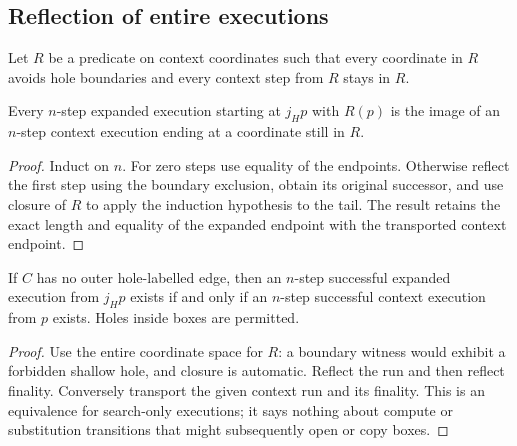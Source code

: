 \subsection{Reflection of entire executions}
Let $R$ be a predicate on context coordinates such that every coordinate in $R$
avoids hole boundaries and every context step from $R$ stays in $R$.
\begin{theorem}
Every $n$-step expanded execution starting at $j_Hp$ with $R(p)$ is the image
of an $n$-step context execution ending at a coordinate still in $R$.
\end{theorem}
\begin{proof}
Induct on $n$. For zero steps use equality of the endpoints. Otherwise reflect
the first step using the boundary exclusion, obtain its original successor,
and use closure of $R$ to apply the induction hypothesis to the tail. The
result retains the exact length and equality of the expanded endpoint with
the transported context endpoint.
\end{proof}
\begin{theorem}
If $C$ has no outer hole-labelled edge, then an $n$-step successful expanded
execution from $j_Hp$ exists if and only if an $n$-step successful context
execution from $p$ exists. Holes inside boxes are permitted.
\end{theorem}
\begin{proof}
Use the entire coordinate space for $R$: a boundary witness would exhibit a
forbidden shallow hole, and closure is automatic. Reflect the run and then
reflect finality. Conversely transport the given context run and its finality.
This is an equivalence for search-only executions; it says nothing about
compute or substitution transitions that might subsequently open or copy boxes.
\end{proof}

